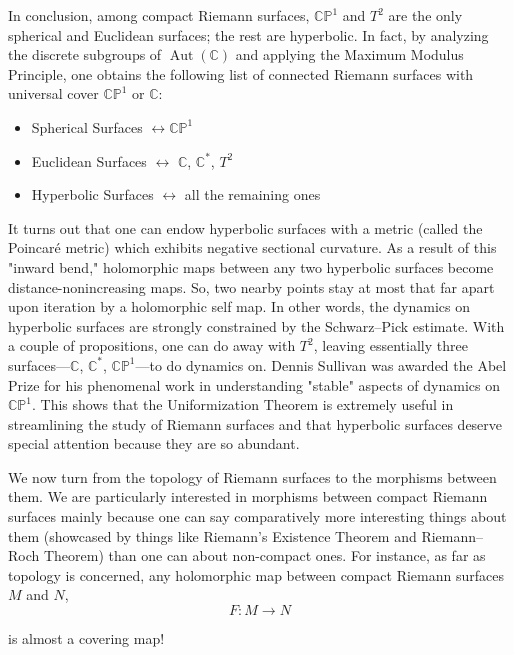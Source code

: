 \documentclass[11pt,a4paper]{article}
\begin{document}
\begin{enumerate}
In conclusion, among compact Riemann surfaces, $\mathbb{CP}^1$ and $T^2$ are the only spherical and Euclidean surfaces; the rest are hyperbolic. In fact, by analyzing the discrete subgroups of $\operatorname{Aut}(\mathbb C)$ and applying the Maximum Modulus Principle, one obtains the following list of connected Riemann surfaces with universal cover $\mathbb{CP}^1$ or $\mathbb C$:
\begin{itemize}
    \item Spherical Surfaces $\longleftrightarrow \mathbb{CP}^1$
    \item Euclidean Surfaces $\longleftrightarrow$ $\mathbb{C}$, $\mathbb{C}^*$, $T^2$
    \item Hyperbolic Surfaces $\longleftrightarrow$ all the remaining ones
\end{itemize}
It turns out that one can endow hyperbolic surfaces with a metric (called the Poincar\'e metric) which exhibits negative sectional curvature. As a result of this "inward bend," holomorphic maps between any two hyperbolic surfaces become distance-nonincreasing maps. So, two nearby points stay at most that far apart upon iteration by a holomorphic self map. In other words, the dynamics on hyperbolic surfaces are strongly constrained by the Schwarz--Pick estimate. With a couple of propositions, one can do away with $T^2$, leaving essentially three surfaces---$\mathbb{C}$, $\mathbb{C}^*$, $\mathbb{CP}^1$---to do dynamics on. Dennis Sullivan was awarded the Abel Prize for his phenomenal work in understanding "stable" aspects of dynamics on $\mathbb{CP}^1$. This shows that the Uniformization Theorem is extremely useful in streamlining the study of Riemann surfaces and that hyperbolic surfaces deserve special attention because they are so abundant.
\end{enumerate}


We now turn from the topology of Riemann surfaces to the morphisms between them. We are particularly interested in morphisms between compact Riemann surfaces mainly because one can say comparatively more interesting things about them (showcased by things like Riemann's Existence Theorem and Riemann--Roch Theorem) than one can about non-compact ones. For instance, as far as topology is concerned, any holomorphic map between compact Riemann surfaces $M$ and $N$,
$$F: M\rightarrow N$$

is almost a covering map!
\end{document}
